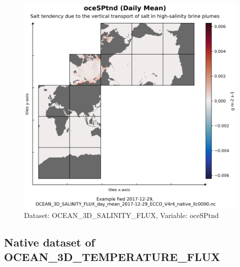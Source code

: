 \begin{figure}[H]
\centering
\includegraphics[scale=0.55]{../images/plots/native_plots/Ocean_Three-Dimensional_Salinity_Fluxes/oceSPtnd.png}
\caption{Dataset: OCEAN\_3D\_SALINITY\_FLUX, Variable: oceSPtnd}
\label{tab:table-OCEAN_3D_SALINITY_FLUX_oceSPtnd-Plot}
\end{figure}
\subsection{Native dataset of OCEAN\_3D\_TEMPERATURE\_FLUX}
\newp
